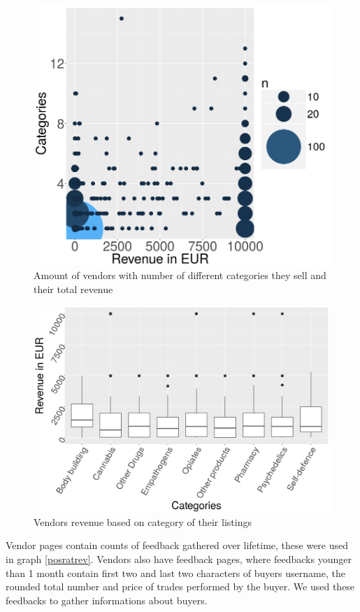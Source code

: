 \documentclass[
  digital, %
  table,   %
  lof,     %
  lot,     %
  oneside
]{fithesis3}
\begin{document}
\begin{figure}[!htb]
    \centering
    \includegraphics[scale=0.4]{catxrev}
    \caption{Amount of vendors with number of different categories they sell and their total revenue}
    \label{catxrev}
\end{figure}

\begin{figure}[!htb]
    \centering
    \includegraphics[scale=0.4]{boxcat}
    \caption{Vendors revenue based on category of their listings}
    \label{boxcat}
\end{figure}


Vendor pages contain counts of feedback gathered over lifetime, these were used
in graph \ref{posratrev}. Vendors also have feedback pages, where feedbacks younger than
1 month contain first two and last two characters of buyers username,
the rounded total number and price of trades performed by the buyer.
We used these feedbacks to gather informations about buyers.
\end{document}
